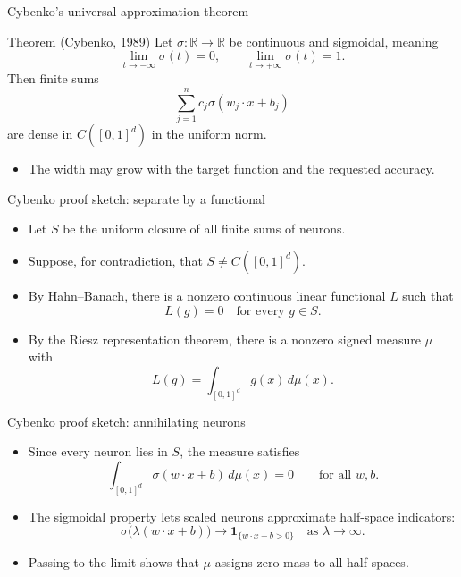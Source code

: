 \documentclass[aspectratio=43,11pt]{beamer}
\newcommand{\slideid}{L2}
\newenvironment{slideitems}{\small\begin{itemize}\setlength\itemsep{0.45em}}{\end{itemize}}
\begin{document}
\renewcommand{\slideid}{L2-S22}
\begin{frame}[t]{Cybenko's universal approximation theorem}
\begin{block}{Theorem (Cybenko, 1989)}
Let $\sigma:\mathbb R\to\mathbb R$ be continuous and sigmoidal, meaning
\[
 \lim_{t\to-\infty}\sigma(t)=0,
 \qquad
 \lim_{t\to+\infty}\sigma(t)=1.
\]
Then finite sums
\[
 \sum_{j=1}^n c_j\sigma(w_j\cdot x+b_j)
\]
are dense in $C([0,1]^d)$ in the uniform norm.
\end{block}
\begin{slideitems}
\item The width may grow with the target function and the requested accuracy.
\end{slideitems}
\end{frame}

\renewcommand{\slideid}{L2-S23}
\begin{frame}[t]{Cybenko proof sketch: separate by a functional}
\begin{slideitems}
\item Let $S$ be the uniform closure of all finite sums of neurons.
\item Suppose, for contradiction, that $S\ne C([0,1]^d)$.
\item By Hahn--Banach, there is a nonzero continuous linear functional $L$ such that
\[
 L(g)=0\quad\text{for every }g\in S.
\]
\item By the Riesz representation theorem, there is a nonzero signed measure $\mu$ with
\[
 L(g)=\int_{[0,1]^d} g(x)\,d\mu(x).
\]
\end{slideitems}
\end{frame}

\renewcommand{\slideid}{L2-S24}
\begin{frame}[t]{Cybenko proof sketch: annihilating neurons}
\begin{slideitems}
\item Since every neuron lies in $S$, the measure satisfies
\[
 \int_{[0,1]^d}\sigma(w\cdot x+b)\,d\mu(x)=0
 \qquad\text{for all } w,b.
\]
\item The sigmoidal property lets scaled neurons approximate half-space indicators:
\[
 \sigma\bigl(\lambda(w\cdot x+b)\bigr)
 \longrightarrow \mathbf 1_{\{w\cdot x+b>0\}}
 \quad\text{as }\lambda\to\infty.
\]
\item Passing to the limit shows that $\mu$ assigns zero mass to all half-spaces.
\end{slideitems}
\end{frame}
\end{document}
